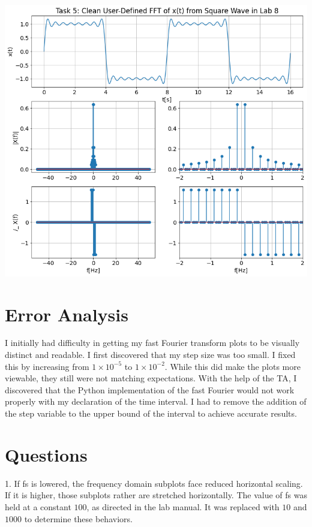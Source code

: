 \documentclass[12pt]{report}
\begin{document}
\begin{center}
	\includegraphics[scale = 0.42]{Lab 9 - Plots/Task5.png}\\[1.0 cm]
\end{center}

\section{Error Analysis}

I initially had difficulty in getting my fast Fourier transform plots to be visually distinct and readable. I first discovered that my step size was too small. I fixed this by increasing from $ 1\times 10^{-5} $ to $ 1\times 10^{-2} $. While this did make the plots more viewable, they still were not matching expectations. With the help of the TA, I discovered that the Python implementation of the fast Fourier would not work properly with my declaration of the time interval. I had to remove the addition of the step variable to the upper bound of the interval to achieve accurate results. \\  

\section{Questions}

1. If fs is lowered, the frequency domain subplots face reduced horizontal scaling. If it is higher, those subplots rather are stretched horizontally. The value of fs was held at a constant $ 100 $, as directed in the lab manual. It was replaced with $ 10 $ and $ 1000 $ to determine these behaviors. \\
\end{document}

